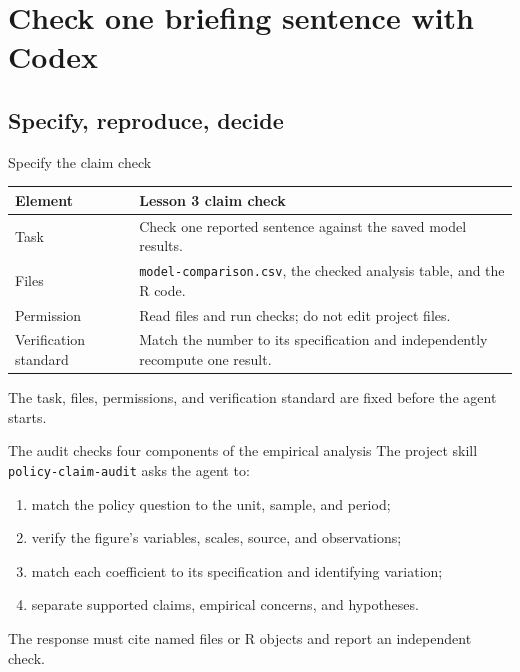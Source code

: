 \section{Check one briefing sentence with Codex}
\subsection{Specify, reproduce, decide}

\begin{frame}{Specify the claim check}
  \begin{center}
  \renewcommand{\arraystretch}{1.4}
  \begin{tabularx}{0.94\textwidth}{@{}>{\RaggedRight\arraybackslash}p{2.25cm}>{\RaggedRight\arraybackslash}X@{}}
    \toprule
    \textbf{Element} & \textbf{Lesson 3 claim check} \\
    \midrule
    Task & Check one reported sentence against the saved model results. \\
    Files & \texttt{model-comparison.csv}, the checked analysis table, and the R code. \\
    Permission & Read files and run checks; do not edit project files. \\
    Verification standard & Match the number to its specification and independently recompute one result. \\
    \bottomrule
  \end{tabularx}
  \end{center}

  \vfill
  The task, files, permissions, and verification standard are fixed before the
  agent starts.
\end{frame}
\begin{frame}{The audit checks four components of the empirical analysis}
  The project skill \texttt{policy-claim-audit} asks the agent to:
  \begin{enumerate}
    \item match the policy question to the unit, sample, and period;
    \item verify the figure's variables, scales, source, and observations;
    \item match each coefficient to its specification and identifying variation;
    \item separate supported claims, empirical concerns, and hypotheses.
  \end{enumerate}

  \vfill
  The response must cite named files or R objects and report an independent check.
\end{frame}

